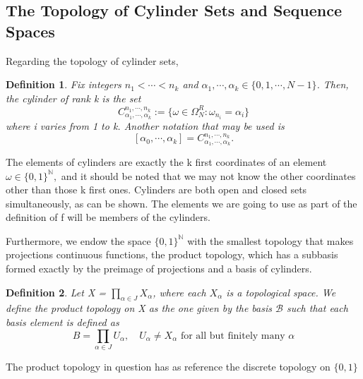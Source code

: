 \documentclass{article}
\newtheorem*{def*}{Definition}
\begin{document}
\subsection{The Topology of Cylinder Sets and Sequence Spaces}
 Regarding the topology of cylinder sets, 
 \begin{def*}
  Fix integers $n _{1} < \cdots < n _{k}$ and $\alpha _{1}, \cdots, \alpha _{k}\in \{0, 1, \cdots, N-1\} $. Then, the cylinder of rank k is the set
  $$
  C _{\alpha _{1}, \cdots, \alpha _{k}}^{n _{1}, \cdots, n _{k}}:= \{\omega\in \Omega _{N}^{R}: \omega _{n_i} = \alpha _{i}\}
  $$
where i varies from 1 to k. Another notation that may be used is 
  $$
    [\alpha_{0}, \cdots, \alpha_{k}] = C_{\alpha_{1},\cdots,\alpha_{k}}^{n_{1},\cdots,n_{k}}.
  $$
 \end{def*}
 The elements of cylinders are exactly the k first coordinates of an element $\omega\in \{0, 1\}^{\mathbb{N}},$ and it should
be noted that we may not know the other coordinates other than those k first ones. Cylinders are both open and closed 
sets simultaneously, as can be shown. The elements we are going to use as part of the definition of f will be members of
the cylinders.
  
  Furthermore, we endow the space $\{0, 1\}^{\mathbb{N}}$ with the smallest topology that makes projections continuous functions, the product topology,
which has a subbasis formed exactly by the preimage of projections and a basis of cylinders. 
\begin{def*}
  Let X = $\prod\limits _{\alpha\in{J}} X _{\alpha}$, where each $X _{\alpha}$ is a topological space. We define the product
topology on X as the one given by the basis $\mathcal{B}$ such that each basis element is defined as
  $$
  B = \prod _{\alpha\in{J}} U _{\alpha}, \quad U _{\alpha}\neq{X _{\alpha}} \text{ for all but finitely many }\alpha
  $$
\end{def*}
  The product topology in question has as reference the discrete topology on $\{0, 1\}$
 
\end{document}
